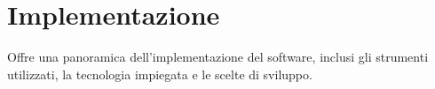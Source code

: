 \section{Implementazione}\label{sec:Implementazione}
Offre una panoramica dell'implementazione del software, inclusi gli strumenti utilizzati, la tecnologia impiegata e le scelte di sviluppo.
\newpage